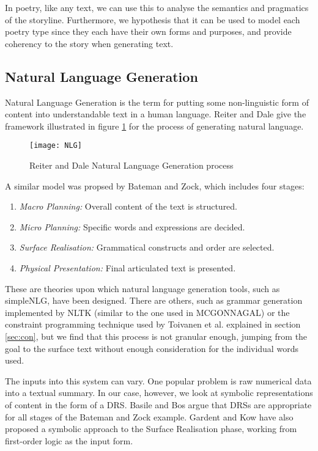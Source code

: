 In poetry, like any text, we can use this to analyse the semantics and pragmatics of the storyline. Furthermore, we hypothesis that it can be used to model each poetry type since they each have their own forms and purposes, and provide coherency to the story when generating text.

\subsection{Natural Language Generation}
Natural Language Generation is the term for putting some non-linguistic form of content into understandable text in a human language. Reiter and Dale give the framework\cite{reiter2000building} illustrated in figure \ref{fig:nlg} for the process of generating natural language.

\begin{figure}[h!]
\centering
\texttt{[image: NLG]}
\caption{Reiter and Dale Natural Language Generation process}
\label{fig:nlg}
\end{figure}

A similar model was propsed by Bateman and Zock\cite{mitkov2003oxford}, which includes four stages:
\begin{enumerate}
\item{\textit{Macro Planning:} Overall content of the text is structured.}
\item{\textit{Micro Planning:} Specific words and expressions are decided.}
\item{\textit{Surface Realisation:} Grammatical constructs and order are selected.}
\item{\textit{Physical Presentation:} Final articulated text is presented.}
\end{enumerate}

These are theories upon which natural language generation tools, such as simpleNLG\cite{gatt2009simplenlg}, have been designed. There are others, such as grammar generation implemented by NLTK (similar to the one used in MCGONNAGAL) or the constraint programming technique used by Toivanen et al. explained in section \ref{sec:con}, but we find that this process is not granular enough, jumping from the goal to the surface text without enough consideration for the individual words used.

The inputs into this system can vary. One popular problem is raw numerical data into a textual summary. In our case, however, we look at symbolic representations of content in the form of a DRS. Basile and Bos argue that DRSs are appropriate for all stages of the Bateman and Zock example\cite{basile2011towards}. Gardent and Kow have also proposed a symbolic approach to the Surface Realisation phase, working from first-order logic as the input form\cite{gardent2007symbolic}.

